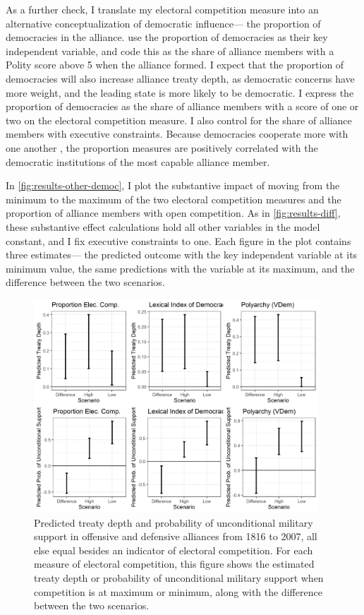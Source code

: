 \documentclass[12pt]{article}
\begin{document}
As a further check, I translate my electoral competition measure into an alternative conceptualization of democratic influence--- the proportion of democracies in the alliance.
\citet{Chibaetal2015} use the proportion of democracies as their key independent variable, and code this as the share of alliance members with a Polity score above 5 when the alliance formed. 
I expect that the proportion of democracies will also increase alliance treaty depth, as democratic concerns have more weight, and the leading state is more likely to be democratic. 
I express the proportion of democracies as the share of alliance members with a score of one or two on the electoral competition measure. 
I also control for the share of alliance members with executive constraints. 
Because democracies cooperate more with one another \citep{Leeds1999}, the proportion measures are positively correlated with the democratic institutions of the most capable alliance member. 


In \autoref{fig:results-other-democ}, I plot the substantive impact of moving from the minimum to the maximum of the two electoral competition measures and the proportion of alliance members with open competition. 
As in \autoref{fig:results-diff}, these substantive effect calculations hold all other variables in the model constant, and I fix executive constraints to one. 
Each figure in the plot contains three estimates--- the predicted outcome with the key independent variable at its minimum value, the same predictions with the variable at its maximum, and the difference between the two scenarios. 


\begin{figure}[hbtp]
\centering
\includegraphics[width=0.95\textwidth]{../figures/results-other-democ.png}
\caption{Predicted treaty depth and probability of unconditional military support in offensive and defensive alliances from 1816 to 2007, all else equal besides an indicator of electoral competition. For each measure of electoral competition, this figure shows the estimated treaty depth or probability of unconditional military support when competition is at maximum or minimum, along with the difference between the two scenarios.}
\label{fig:results-other-democ}
\end{figure}
\end{document}
